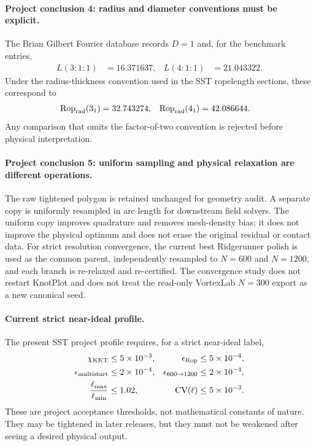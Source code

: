 \documentclass[11pt]{article}
\theoremstyle{definition}
\theoremstyle{plain}
\theoremstyle{remark}
\begin{document}
\paragraph{Project conclusion 4: radius and diameter conventions must be explicit.}
The Brian Gilbert Fourier database records $D=1$ and, for the benchmark entries,
\begin{align}
    L(3{:}1{:}1)&=16.371637,
    &
    L(4{:}1{:}1)&=21.043322.
    \label{eq:genesis_gilbert_length_benchmarks}
\end{align}
Under the radius-thickness convention used in the SST ropelength sections,
these correspond to
\begin{align}
    \operatorname{Rop}_{\rm rad}(3_1)&=32.743274,
    &
    \operatorname{Rop}_{\rm rad}(4_1)&=42.086644.
    \label{eq:genesis_gilbert_rop_benchmarks}
\end{align}
Any comparison that omits the factor-of-two convention is rejected before
physical interpretation.

\paragraph{Project conclusion 5: uniform sampling and physical relaxation are different operations.}
The raw tightened polygon is retained unchanged for geometry audit.  A separate
copy is uniformly resampled in arc length for downstream field solvers.  The
uniform copy improves quadrature and removes mesh-density bias; it does not
improve the physical optimum and does not erase the original residual or
contact data.  For strict resolution convergence, the current best Ridgerunner
polish is used as the common parent, independently resampled to $N=600$ and
$N=1200$, and each branch is re-relaxed and re-certified.  The convergence
study does not restart KnotPlot and does not treat the read-only VortexLab
$N=300$ export as a new canonical seed.

\paragraph{Current strict near-ideal profile.}
The present SST project profile requires, for a strict near-ideal label,
\begin{align}
    \chi_{\rm KKT}&\le5\times10^{-3},
    &
    \epsilon_{\rm Rop}&\le5\times10^{-4},
    \\
    \epsilon_{\rm multistart}&\le2\times10^{-4},
    &
    \epsilon_{600\rightarrow1200}&\le2\times10^{-4},
    \\
    \frac{\ell_{\max}}{\ell_{\min}}&\le1.02,
    &
    \operatorname{CV}(\ell)&\le5\times10^{-3}.
    \label{eq:genesis_strict_near_ideal_profile}
\end{align}
These are project acceptance thresholds, not mathematical constants of nature.
They may be tightened in later releases, but they must not be weakened after
seeing a desired physical output.
\end{document}
